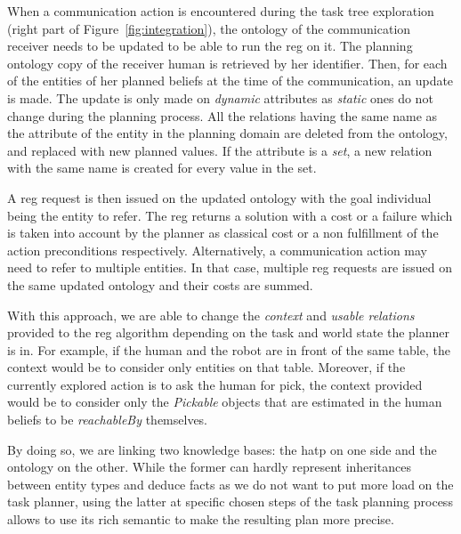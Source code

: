 \documentclass[a4paper,11pt,twoside]{StyleThese}
\begin{document}
When a communication action is encountered during the task tree exploration (right part of Figure~\ref{fig:integration}), the ontology of the communication receiver needs to be updated to be able to run the \acrshort{reg} on it.
The planning ontology copy of the receiver human is retrieved by her identifier. Then, for each of the entities of her planned beliefs at the time of the communication, an update is made. The update is only made on \textit{dynamic} attributes as \textit{static} ones do not change during the planning process. All the relations having the same name as the attribute of the entity in the planning domain are deleted from the ontology, and replaced with new planned values. If the attribute is a \textit{set}, a new relation with the same name is created for every value in the set.

A \acrshort{reg} request is then issued on the updated ontology with the goal individual being the entity to refer. The \acrshort{reg} returns a solution with a cost or a failure which is taken into account by the planner as classical cost or a non fulfillment of the action preconditions respectively. Alternatively, a communication action may need to refer to multiple entities. In that case, multiple \acrshort{reg} requests are issued on the same updated ontology and their costs are summed.

With this approach, we are able to change the \textit{context} and \textit{usable relations} provided to the \acrshort{reg} algorithm depending on the task and world state the planner is in. For example, if the human and the robot are in front of the same table, the context would be to consider only entities on that table. Moreover, if the currently explored action is to ask the human for pick, the context provided would be to consider only the \textit{Pickable} objects that are estimated in the human beliefs to be \textit{reachableBy} themselves.

By doing so, we are linking two knowledge bases: the \acrshort{hatp} on one side and the ontology on the other. While the former can hardly represent inheritances between entity types and deduce facts as we do not want to put more load on the task planner, using the latter at specific chosen steps of the task planning process allows to use its rich semantic to make the resulting plan more precise.
\end{document}
